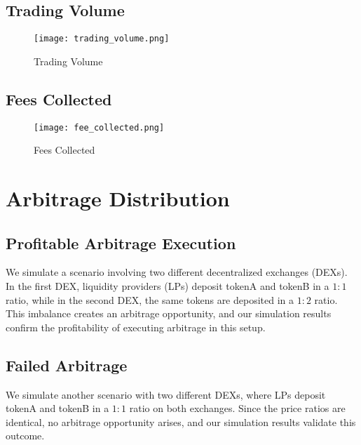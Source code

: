 \documentclass[12pt,a4paper]{article}
\begin{document}
\subsection*{Trading Volume}

\begin{figure}[H]
    \centering
    \texttt{[image: trading\_volume.png]}
    \caption{Trading Volume}
    \label{fig:trading_volume}
\end{figure}

\subsection*{Fees Collected}

\begin{figure}[H]
    \centering
    \texttt{[image: fee\_collected.png]}
    \caption{Fees Collected}
    \label{fig:fees_collected}
\end{figure}

\section*{Arbitrage Distribution}

\subsection*{Profitable Arbitrage Execution}
We simulate a scenario involving two different decentralized exchanges (DEXs). In the first DEX, liquidity providers (LPs) deposit tokenA and tokenB in a $1:1$ ratio, while in the second DEX, the same tokens are deposited in a $1:2$ ratio. This imbalance creates an arbitrage opportunity, and our simulation results confirm the profitability of executing arbitrage in this setup.

\subsection*{Failed Arbitrage}
We simulate another scenario with two different DEXs, where LPs deposit tokenA and tokenB in a $1:1$ ratio on both exchanges. Since the price ratios are identical, no arbitrage opportunity arises, and our simulation results validate this outcome.
\end{document}
